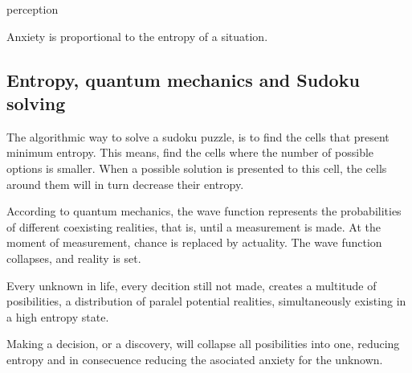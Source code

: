 
\begin{center}
\vspace*{\fill}
\Huge{perception}

\vspace{2cm}

\begin{flushright}
\large{
\textit{ \propto {}}}
\end{flushright}
\vspace*{\fill}
\end{center}



Anxiety is proportional to the entropy of a situation. 


\subsection*{ Entropy, quantum mechanics and Sudoku solving} 

The algorithmic way to solve a sudoku puzzle, is to find the cells 
that present minimum entropy. 
This means, find the cells where the number of possible options is smaller.
When a possible solution is presented to this cell, the cells around them will 
in turn decrease their entropy. 

According to quantum mechanics, the wave function represents the probabilities 
of different coexisting realities, that is, until a 
measurement is made. At the moment of measurement, chance is replaced by 
actuality. The wave function collapses, and reality is set.

Every unknown in life, every decition still not made, creates a multitude of 
posibilities, a distribution of paralel potential realities, simultaneously 
existing in a high entropy state. 

Making a decision, or a discovery, will collapse all posibilities into one, 
reducing entropy and in consecuence reducing the asociated anxiety for the unknown. 








